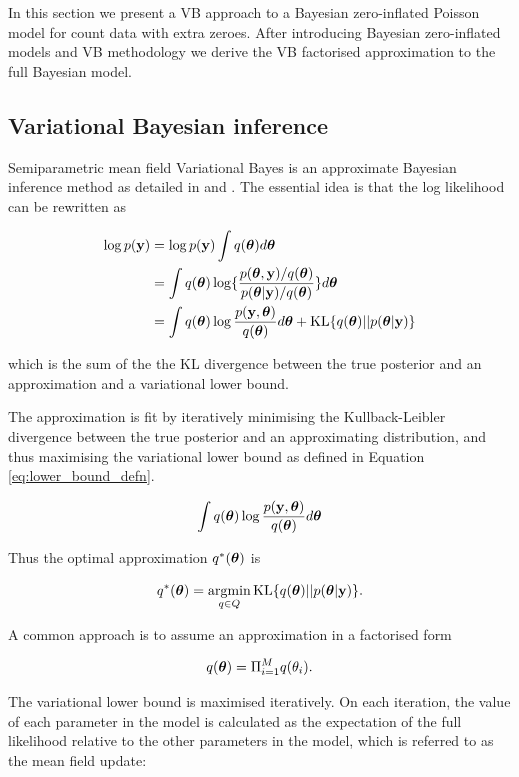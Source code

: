 \documentclass{article}[12pt]
\begin{document}
In this section we present a VB approach to a Bayesian zero-inflated Poisson model for count data with extra
zeroes. After introducing Bayesian zero-inflated models and VB methodology we derive the VB factorised
approximation to the full Bayesian model.

\subsection{Variational Bayesian inference}

Semiparametric mean field Variational Bayes is an approximate Bayesian inference method as detailed in
\cite{ormerod10} and \cite{RohdeWand2015}. The essential idea is that the log likelihood can be rewritten as

\begin{align*}
\log p(\vy) &= \log p(\vy) \int q(\vtheta) d \vtheta \\
&= \int q(\vtheta) \log \{ \frac{p(\vtheta, \vy) / q(\vtheta)}{p(\vtheta | \vy) / q(\vtheta)} \} d \vtheta \\
&= \int q(\vtheta) \log \frac{p(\vy, \vtheta)}{q(\vtheta)} d \vtheta +
	 \text{KL} \{ {q(\vtheta) || p(\vtheta|\vy)} \} %
\end{align*}

which is the sum of the the KL divergence between the true posterior and an approximation and a variational
lower bound.

The approximation is fit by iteratively minimising the Kullback-Leibler divergence between the true posterior
and an approximating distribution, and thus maximising the variational lower bound as defined in Equation
\ref{eq:lower_bound_defn}.

\begin{equation}
\label{eq:lower_bound_defn}
\int q({\boldsymbol \theta}) \log \frac{p({\bf y}, {\boldsymbol \theta})}{q({\boldsymbol \theta})} d {\boldsymbol \theta}
\end{equation}

Thus the optimal approximation $q^*({\boldsymbol \theta})$ is

$$
q^*(\vtheta) = \argmin_{q \in Q} \text{KL} \{ {q(\vtheta) || p(\vtheta|\vy)} \}.
$$

A common approach is to assume an approximation in a factorised form

$$q({\boldsymbol \theta}) = \Pi_{i=1}^M q(\theta_i).$$

The variational lower bound is maximised iteratively. On each iteration, the value of each parameter in the
model is calculated as the expectation of the full likelihood relative to the other parameters in the model,
which is referred to as the mean field update:
\end{document}
